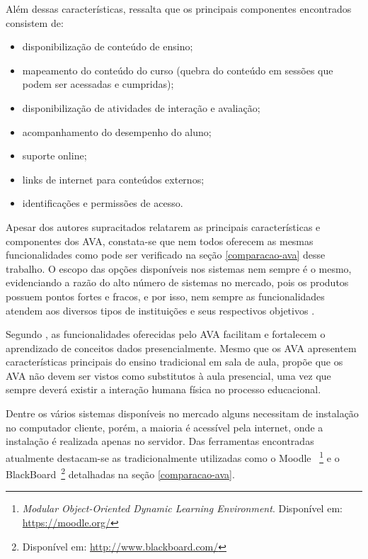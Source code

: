 Além dessas características,  ressalta que os principais componentes encontrados consistem de:
\begin{itemize}
\item disponibilização de conteúdo de ensino;
\item mapeamento do conteúdo do curso (quebra do conteúdo em sessões que podem ser acessadas e cumpridas);
\item disponibilização de atividades de interação e avaliação;
\item acompanhamento do desempenho do aluno;
\item suporte online;
\item links de internet para conteúdos externos;
\item identificações e permissões de acesso.
\end{itemize}

Apesar dos autores supracitados relatarem as principais características e componentes dos AVA, constata-se que nem todos oferecem as mesmas funcionalidades como pode ser verificado na seção \ref{comparacao-ava} desse trabalho. O escopo das opções disponíveis nos sistemas nem sempre é o mesmo, evidenciando a razão do alto número de sistemas no mercado, pois os produtos possuem pontos fortes e fracos, e por isso, nem sempre as funcionalidades atendem aos diversos tipos de instituições e seus respectivos objetivos \cite{aguado2013dimensoes}.

Segundo , as funcionalidades oferecidas pelo AVA facilitam e fortalecem o aprendizado de conceitos dados presencialmente. Mesmo que os AVA apresentem características principais do ensino tradicional em sala de aula,  propõe que os AVA não devem ser vistos como substitutos à aula presencial, uma vez que sempre deverá existir a interação humana física no processo educacional.

Dentre os vários sistemas disponíveis no mercado alguns necessitam de instalação no computador cliente, porém, a maioria é acessível pela internet, onde a instalação é realizada apenas no servidor. Das ferramentas encontradas atualmente destacam-se as tradicionalmente utilizadas como o Moodle ~\footnote{\textit{Modular Object-Oriented Dynamic Learning Environment}. Disponível em: \url{https://moodle.org/}} e o BlackBoard~\footnote{Disponível em: \url{http://www.blackboard.com/}} detalhadas na seção \ref{comparacao-ava}.

